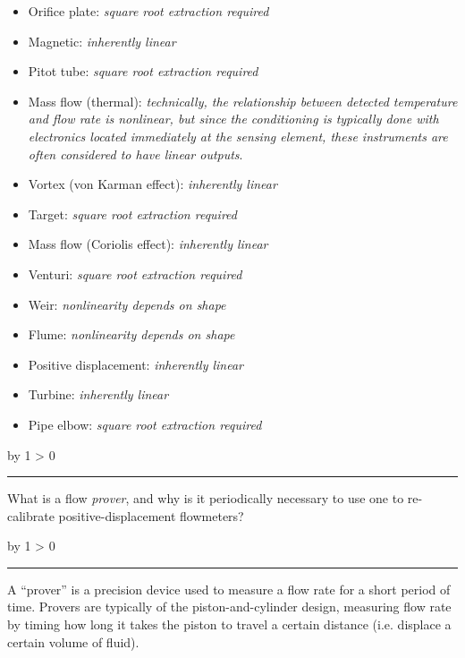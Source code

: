 \documentclass[12pt,a4paper]{article}
\def\oppgave{
            \advance\questnum by 1
            \ifnum \questnum > 0
                 \hrule
                 \vskip 3pt
                 \leftline{Oppgave \the\questnum}
                 \vskip 3pt \fi}
\def\svar{
           \advance\answnum by 1
           \ifnum \answnum > 0
                \hrule
                \vskip 3pt
                \leftline{Svar \the\answnum}
                \vskip 3pt \fi}
\begin{document}
\begin{itemize}
\item{} Orifice plate: {\it square root extraction required}
\vskip 5pt
\item{} Magnetic: {\it inherently linear}
\vskip 5pt
\item{} Pitot tube: {\it square root extraction required}
\vskip 5pt
\item{} Mass flow (thermal): {\it technically, the relationship between detected temperature and flow rate is nonlinear, but since the conditioning is typically done with electronics located immediately at the sensing element, these instruments are often considered to have linear outputs}.
\vskip 5pt
\item{} Vortex (von Karman effect): {\it inherently linear}
\vskip 5pt
\item{} Target: {\it square root extraction required}
\vskip 5pt
\item{} Mass flow (Coriolis effect): {\it inherently linear}
\vskip 5pt
\item{} Venturi: {\it square root extraction required}
\vskip 5pt
\item{} Weir: {\it nonlinearity depends on shape}
\vskip 5pt
\item{} Flume: {\it nonlinearity depends on shape}
\vskip 5pt
\item{} Positive displacement: {\it inherently linear}
\vskip 5pt
\item{} Turbine: {\it inherently linear}
\vskip 5pt
\item{} Pipe elbow: {\it square root extraction required}
\end{itemize}


\vfil \eject 



\oppgave{} 

What is a flow {\it prover}, and why is it periodically necessary to use one to re-calibrate positive-displacement flowmeters?

\vskip 10pt \filbreak 





\svar{} 

A ``prover'' is a precision device used to measure a flow rate for a short period of time.  Provers are typically of the piston-and-cylinder design, measuring flow rate by timing how long it takes the piston to travel a certain distance (i.e. displace a certain volume of fluid).
\end{document}
